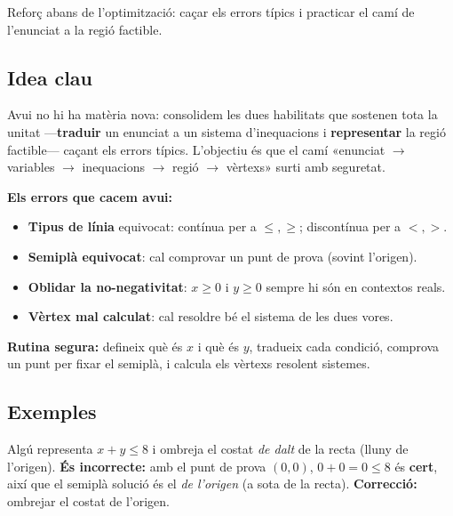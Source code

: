 %
{Reforç abans de l'optimització: caçar els errors típics i practicar el camí de l'enunciat a la regió factible.}

\subsection{Idea clau}

Avui no hi ha matèria nova: consolidem les dues habilitats que sostenen tota la
unitat —\textbf{traduir} un enunciat a un sistema d'inequacions i \textbf{representar}
la regió factible— caçant els errors típics. L'objectiu és que el camí «enunciat
$\rightarrow$ variables $\rightarrow$ inequacions $\rightarrow$ regió $\rightarrow$
vèrtexs» surti amb seguretat.

\begin{idea}
\textbf{Els errors que cacem avui:}
\begin{itemize}[leftmargin=1.4em, itemsep=2pt]
  \item \textbf{Tipus de línia} equivocat: contínua per a $\le,\ge$; discontínua per a
        $<,>$.
  \item \textbf{Semiplà equivocat}: cal comprovar un punt de prova (sovint l'origen).
  \item \textbf{Oblidar la no-negativitat}: $x\ge 0$ i $y\ge 0$ sempre hi són en
        contextos reals.
  \item \textbf{Vèrtex mal calculat}: cal resoldre bé el sistema de les dues vores.
\end{itemize}
\textbf{Rutina segura:} defineix què és $x$ i què és $y$, tradueix cada condició,
comprova un punt per fixar el semiplà, i calcula els vèrtexs resolent sistemes.
\end{idea}

\subsection{Exemples}

\begin{exemple}
Algú representa $x+y\le 8$ i ombreja el costat \emph{de dalt} de la recta (lluny de
l'origen). \textbf{És incorrecte:} amb el punt de prova $(0,0)$, $0+0=0\le 8$ és
\textbf{cert}, així que el semiplà solució és el \emph{de l'origen} (a sota de la
recta). \textbf{Correcció:} ombrejar el costat de l'origen.
\end{exemple}

